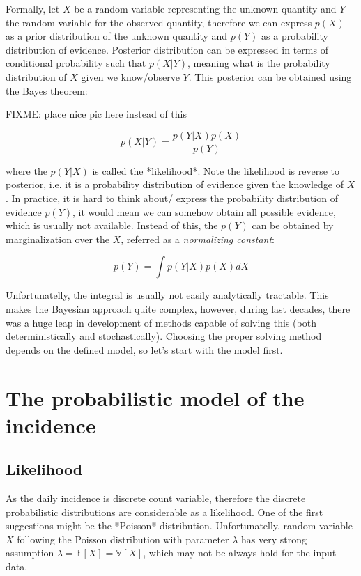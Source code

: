 \documentclass[
  digital, %
  table,   %
  twoside, %
  12pt,
  lof,     %
  lot,     %
]{fithesis3}
\begin{document}
Formally, let $X$ be a random variable representing 
the unknown quantity and $Y$ the random variable for 
the observed quantity, therefore we can express $p(X)$ 
as a prior distribution of the unknown quantity and 
$p(Y)$ as a probability distribution of evidence. 
Posterior distribution can be expressed in terms of 
conditional probability such that $p(X | Y)$, meaning 
what is the probability distribution of $X$ given we 
know/observe $Y$. 
This posterior can be obtained using the Bayes 
theorem:

FIXME: place nice pic here instead of this

\begin{equation}
p( X | Y ) = \frac{p( Y | X ) p(X)}{p(Y)}
\end{equation}

where the $p( Y | X )$ is called the *likelihood*. 
Note the likelihood is reverse to posterior, i.e. it 
is a probability distribution of evidence given the 
knowledge of $X$. 
In practice, it is hard to think about/ express the 
probability distribution of evidence $p(Y)$, it would 
mean we can somehow obtain all possible evidence, which 
is usually not available. 
Instead of this, the $p(Y)$ can be obtained by 
marginalization over the $X$, referred as a 
\textit{normalizing constant}:

\begin{equation}
p(Y) = \int p( Y | X ) p(X) dX
\end{equation}

Unfortunatelly, the integral is usually not easily 
analytically tractable. 
This makes the Bayesian approach quite complex, 
however, during last decades, there was a huge leap 
in development of methods capable of solving this 
(both deterministically and stochastically). 
Choosing the proper solving method depends on the 
defined model, so let's start with the model first.


\section{The probabilistic model of the incidence}

\subsection{Likelihood}

As the daily incidence is discrete count variable, 
therefore the discrete probabilistic distributions are 
considerable as a likelihood. One of the first suggestions 
might be the *Poisson* distribution. Unfortunatelly, random 
variable $X$ following the Poisson distribution with 
parameter $\lambda$ has very strong assumption 
$\lambda = \mathbb{E}\left[ X \right] = \mathbb{V}\left[ X \right]$, 
which may not be always hold for the input data. 
\end{document}
